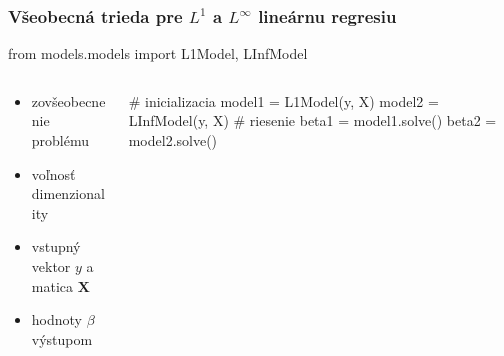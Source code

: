 \documentclass[presentation.tex]{subfiles}
\begin{document}
	\begin{frame}[fragile]
		\frametitle{Všeobecná trieda pre $L^1$ a $L^{\infty}$ lineárnu regresiu}
        \begin{python}
from models.models import L1Model, LInfModel
        \end{python}
        \begin{columns}
            \begin{column}{0.55\textwidth}
                \begin{itemize}
                    \item zovšeobecnenie problému
                    \item voľnosť dimenzionality
                    \item vstupný vektor $y$ a matica $\mathbf{X}$
                    \item hodnoty $\beta$ výstupom
                \end{itemize}
            \end{column}

            \begin{column}{0.45\textwidth}
                \begin{python}
# inicializacia
model1 = L1Model(y, X)
model2 = LInfModel(y, X)
# riesenie
beta1 = model1.solve()
beta2 = model2.solve()
                \end{python}
            \end{column}
        \end{columns}
	\end{frame}
\end{document}
